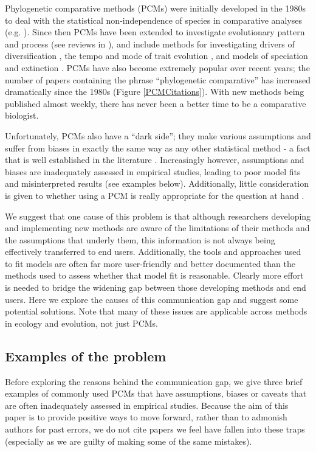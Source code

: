\documentclass[a4paper,12pt]{article}
\begin{document}
Phylogenetic comparative methods (PCMs) were initially developed in the 1980s to deal with the statistical non-independence of species in comparative analyses (e.g. \citealp{felsenstein1985phylogenies,grafen1989phylogenetic}).  
Since then PCMs have been extended to investigate evolutionary pattern and process (see reviews in \citealp{o2012evolutionary, pennell2013integrative}), and include methods for investigating drivers of diversification \citep[e.g.][]{maddison2007estimating}, the tempo and mode of trait evolution \citep[e.g.][]{o2012evolutionary}, and models of speciation and extinction \citep[e.g.][]{nee1994extinction}. 
PCMs have also become extremely popular over recent years; the number of papers containing the phrase ``phylogenetic comparative'' has increased dramatically since the 1980s (Figure \ref{PCMCitations}). 
With new methods being published almost weekly, there has never been a better time to be a comparative biologist.

Unfortunately, PCMs also have a ``dark side''; they make various assumptions and suffer from biases in exactly the same way as any other statistical method - a fact that is well established in the literature \citep[e.g.][]{freckleton2009seven,losos2011seeing,blomberg2012independent,boettiger2012your}.
Increasingly however, assumptions and biases are inadequately assessed in empirical studies, leading to poor model fits and misinterpreted results (see examples below).
Additionally, little consideration is given to whether using a PCM is really appropriate for the question at hand \citep{westoby1995misinterpreting,losos2011seeing}. 

We suggest that one cause of this problem is that although researchers developing and implementing new methods are aware of the limitations of their methods and the assumptions that underly them, this information is not always being effectively transferred to end users.
Additionally, the tools and approaches used to fit models are often far more user-friendly and better documented than the methods used to assess whether that model fit is reasonable. 
Clearly more effort is needed to bridge the widening gap between those developing methods and end users. 
Here we explore the causes of this communication gap and suggest some potential solutions.
Note that many of these issues are applicable across methods in ecology and evolution, not just PCMs.

\subsection{Examples of the problem}
Before exploring the reasons behind the communication gap, we give three brief examples of commonly used PCMs that have assumptions, biases or caveats that are often inadequately assessed in empirical studies.
Because the aim of this paper is to provide positive ways to move forward, rather than to admonish authors for past errors, we do not cite papers we feel have fallen into these traps (especially as we are guilty of making some of the same mistakes). 
\end{document}
